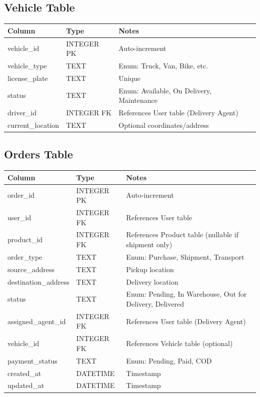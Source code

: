 \documentclass[12pt,a4paper]{article}
\begin{document}
\subsection{Vehicle Table}
\begin{longtable}{|l|l|l|}
\hline
\textbf{Column} & \textbf{Type} & \textbf{Notes} \\
\hline
vehicle\_id & INTEGER PK & Auto-increment \\
vehicle\_type & TEXT & Enum: Truck, Van, Bike, etc. \\
license\_plate & TEXT & Unique \\
status & TEXT & Enum: Available, On Delivery, Maintenance \\
driver\_id & INTEGER FK & References User table (Delivery Agent) \\
current\_location & TEXT & Optional coordinates/address \\
\hline
\end{longtable}

\subsection{Orders Table}
\begin{longtable}{|l|l|l|}
\hline
\textbf{Column} & \textbf{Type} & \textbf{Notes} \\
\hline
order\_id & INTEGER PK & Auto-increment \\
user\_id & INTEGER FK & References User table \\
product\_id & INTEGER FK & References Product table (nullable if shipment only) \\
order\_type & TEXT & Enum: Purchase, Shipment, Transport \\
source\_address & TEXT & Pickup location \\
destination\_address & TEXT & Delivery location \\
status & TEXT & Enum: Pending, In Warehouse, Out for Delivery, Delivered \\
assigned\_agent\_id & INTEGER FK & References User table (Delivery Agent) \\
vehicle\_id & INTEGER FK & References Vehicle table (optional) \\
payment\_status & TEXT & Enum: Pending, Paid, COD \\
created\_at & DATETIME & Timestamp \\
updated\_at & DATETIME & Timestamp \\
\hline
\end{longtable}
\end{document}
